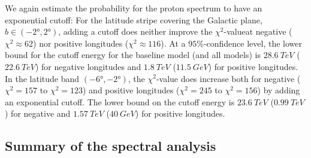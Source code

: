 We again estimate the probability for the proton spectrum to have an exponential cutoff: For the latitude stripe covering the Galactic plane, $b \in (-\ang{2}, \ang{2})$, adding a cutoff does neither improve the $\chi^2$-valueat negative ($\chi^2 \approx 62$) nor positive longitudes ($\chi^2 \approx 116$). At a $95\%$-confidence level, the lower bound for the cutoff energy for the baseline model (and all models) is $\SI{28.6}{TeV}$ ($\SI{22.6}{TeV}$) for negative longitudes and $\SI{1.8}{TeV}$ ($\SI{11.5}{GeV}$) for positive longitudes.\\
In the latitude band $(-\ang{6}, -\ang{2})$, the $\chi^2$-value does increase both for negative ($\chi^2 = 157$ to $\chi^2 = 123$) and positive longitudes ($\chi^2 = 245$ to $\chi^2 = 156$) by adding an exponential cutoff. The lower bound on the cutoff energy is $\SI{23.6}{TeV}$ ($\SI{0.99}{TeV}$) for negative and $\SI{1.57}{TeV}$ ($\SI{40}{GeV}$) for positive longitudes.



\subsection{Summary of the spectral analysis}


